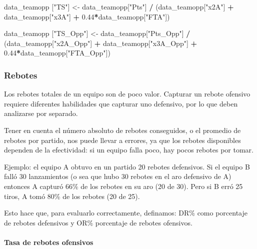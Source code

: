 \documentclass[
]{article}
\newenvironment{Shaded}{\begin{snugshade}}{\end{snugshade}}
\newcommand{\FloatTok}[1]{\textcolor[rgb]{0.00,0.00,0.81}{#1}}
\newcommand{\NormalTok}[1]{#1}
\newcommand{\OperatorTok}[1]{\textcolor[rgb]{0.81,0.36,0.00}{\textbf{#1}}}
\newcommand{\StringTok}[1]{\textcolor[rgb]{0.31,0.60,0.02}{#1}}
\begin{document}
\begin{Shaded}
\begin{Highlighting}[]
\NormalTok{data_teamopp [}\StringTok{"TS"}\NormalTok{] <-}\StringTok{ }\NormalTok{data_teamopp[}\StringTok{"Pts"}\NormalTok{] }\OperatorTok{/}
\StringTok{  }\NormalTok{(data_teamopp[}\StringTok{"x2A"}\NormalTok{] }\OperatorTok{+}\StringTok{ }\NormalTok{data_teamopp[}\StringTok{"x3A"}\NormalTok{] }\OperatorTok{+}\StringTok{ }\FloatTok{0.44}\OperatorTok{*}\NormalTok{data_teamopp[}\StringTok{"FTA"}\NormalTok{])}

\NormalTok{data_teamopp [}\StringTok{"TS_Opp"}\NormalTok{] <-}\StringTok{ }\NormalTok{data_teamopp[}\StringTok{"Pts_Opp"}\NormalTok{] }\OperatorTok{/}
\StringTok{  }\NormalTok{(data_teamopp[}\StringTok{"x2A_Opp"}\NormalTok{] }\OperatorTok{+}\StringTok{ }\NormalTok{data_teamopp[}\StringTok{"x3A_Opp"}\NormalTok{] }\OperatorTok{+}\StringTok{ }\FloatTok{0.44}\OperatorTok{*}\NormalTok{data_teamopp[}\StringTok{"FTA_Opp"}\NormalTok{])}
\end{Highlighting}
\end{Shaded}

\newpage

\hypertarget{rebotes}{%
\subsubsection{Rebotes}\label{rebotes}}

Los rebotes totales de un equipo son de poco valor. Capturar un rebote
ofensivo requiere diferentes habilidades que capturar uno defensivo, por
lo que deben analizarse por separado.

Tener en cuenta el número absoluto de rebotes conseguidos, o el promedio
de rebotes por partido, nos puede llevar a errores, ya que los rebotes
disponibles dependen de la efectividad: si un equipo falla poco, hay
pocos rebotes por tomar.

Ejemplo: el equipo A obtuvo en un partido 20 rebotes defensivos. Si el
equipo B falló 30 lanzamientos (o sea que hubo 30 rebotes en el aro
defensivo de A) entonces A capturó 66\% de los rebotes en su aro (20 de
30). Pero si B erró 25 tiros, A tomó 80\% de los rebotes (20 de 25).

Esto hace que, para evaluarlo correctamente, definamos: DR\% como
porcentaje de rebotes defensivos y OR\% porcentaje de rebotes ofensivos.

\hypertarget{tasa-de-rebotes-ofensivos}{%
\paragraph{Tasa de rebotes ofensivos}\label{tasa-de-rebotes-ofensivos}}
\end{document}
